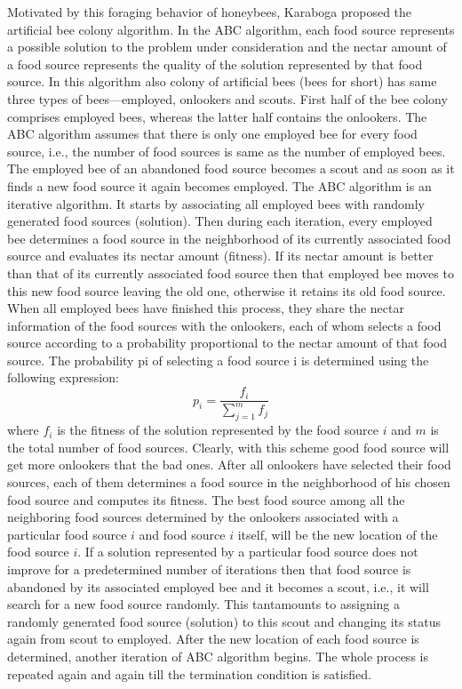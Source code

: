 \documentclass[pdftex,11pt]{article}
\begin{document}
Motivated by this foraging behavior of honeybees, Karaboga proposed the artificial bee colony algorithm. In the ABC algorithm, each food source represents a possible solution to the problem under consideration and the nectar amount of a food source represents the quality of the solution represented by that food source. In this algorithm also colony of artificial bees (bees for short) has same three types of bees—employed, onlookers and scouts. First half of the bee colony comprises employed bees, whereas the latter half contains the onlookers. The ABC algorithm assumes that there is only one employed bee for every food source, i.e., the number of food sources is same as the number of employed bees. The employed bee of an abandoned food source becomes a scout and as soon as it finds a new food source it again becomes employed. The ABC algorithm is an iterative algorithm. It starts by associating all employed bees with randomly generated food sources (solution). Then during each iteration, every employed bee determines a food source in the neighborhood of its currently associated food source and evaluates its nectar amount (fitness). If its nectar amount is better than that of its currently associated food source then that employed bee moves to this new food source leaving the old one, otherwise it retains its old food source. When all employed bees have finished this process, they share the nectar information of the food sources with the onlookers, each of whom selects a food source according to a probability proportional to the nectar amount of that food source. The probability pi of selecting a food source i is determined using the following expression:
\begin{equation}
p_i = \frac{f_i}{\sum^m_{j=1}f_j}
\end{equation}
where $f_i$ is the fitness of the solution represented by the food source $i$ and $m$ is the total number of food sources. Clearly, with this scheme good food source will get more onlookers that the bad ones. After all onlookers have selected their food sources, each of them determines a food source in the neighborhood of his chosen food source and computes its fitness. The best food source among all the neighboring food sources determined by the onlookers associated with a particular food source $i$ and food source $i$ itself, will be the new location of the food source $i$. If a solution represented by a particular food source does not improve for a predetermined number of iterations then that food source is abandoned by its associated employed bee and it becomes a scout, i.e., it will search for a new food source randomly. This tantamounts to assigning a randomly generated food source (solution) to this scout and changing its status again from scout to employed. After the new location of each food source is determined, another iteration of ABC algorithm begins. The whole process is repeated again and again till the termination condition is satisfied.
\end{document}
